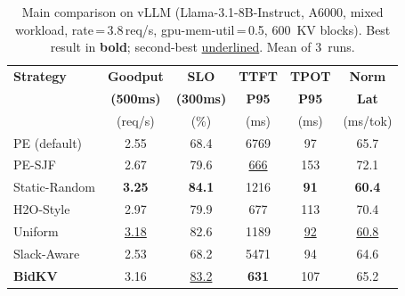 \begin{table}[t]
\centering
\caption{Main comparison on vLLM (Llama-3.1-8B-Instruct, A6000, mixed workload,
  rate\,=\,3.8\,req/s, gpu-mem-util\,=\,0.5, 600~KV blocks).
  Best result in \textbf{bold}; second-best \underline{underlined}.
  Mean of 3~runs.}
\label{tab:main}
\small
\begin{tabular}{@{}l c c c c c@{}}
\toprule
\textbf{Strategy}
  & \textbf{Goodput}  & \textbf{SLO}     & \textbf{TTFT}
  & \textbf{TPOT}     & \textbf{Norm} \\
  & \textbf{(500ms)}  & \textbf{(300ms)} & \textbf{P95}
  & \textbf{P95}      & \textbf{Lat} \\
  & (req/s)           & (\%)             & (ms)
  & (ms)              & (ms/tok) \\
\midrule
PE (default)             & 2.55              & 68.4              & 6769              & 97                & 65.7 \\
PE-SJF                   & 2.67              & 79.6              & \underline{666}   & 153               & 72.1 \\
Static-Random            & \textbf{3.25}     & \textbf{84.1}     & 1216              & \textbf{91}       & \textbf{60.4} \\
H2O-Style                & 2.97              & 79.9              & 677               & 113               & 70.4 \\
Uniform                  & \underline{3.18}  & 82.6              & 1189              & \underline{92}    & \underline{60.8} \\
Slack-Aware              & 2.53              & 68.2              & 5471              & 94                & 64.6 \\
\textbf{BidKV}           & 3.16              & \underline{83.2}  & \textbf{631}      & 107               & 65.2 \\
\bottomrule
\end{tabular}
\end{table}
